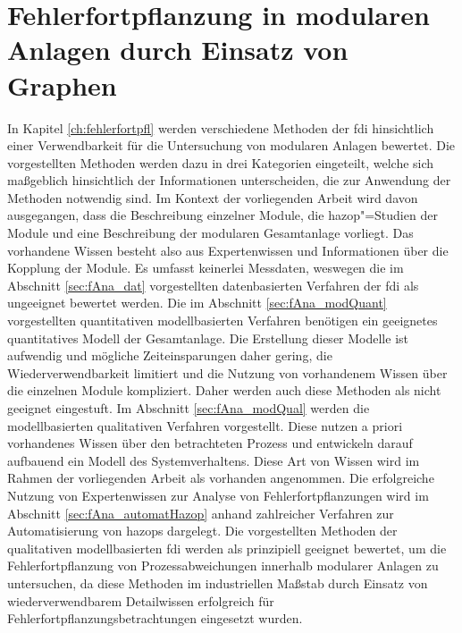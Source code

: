 \chapter{Fehlerfortpflanzung in modularen Anlagen durch Einsatz von Graphen}\label{ch:ffpflMod}
In Kapitel \ref{ch:fehlerfortpfl} werden verschiedene Methoden der \acf{fdi} hinsichtlich einer Verwendbarkeit f\"ur die Untersuchung von modularen Anlagen bewertet. Die vorgestellten Methoden werden dazu in drei Kategorien eingeteilt, welche sich ma\ss{}geblich hinsichtlich der Informationen unterscheiden, die zur Anwendung der Methoden notwendig sind. Im Kontext der vorliegenden Arbeit wird davon ausgegangen, dass die Beschreibung einzelner Module, die \ac{hazop}"=Studien der Module und eine Beschreibung der modularen Gesamtanlage vorliegt. Das vorhandene Wissen besteht also aus Expertenwissen und Informationen \"uber die Kopplung der Module. Es umfasst keinerlei Messdaten, weswegen die im Abschnitt \ref{sec:fAna_dat} vorgestellten datenbasierten Verfahren der \ac{fdi} als ungeeignet bewertet werden. \newline
Die im Abschnitt \ref{sec:fAna_modQuant} vorgestellten quantitativen modellbasierten Verfahren ben\"otigen ein geeignetes quantitatives Modell der Gesamtanlage. Die Erstellung dieser Modelle ist aufwendig und m\"ogliche Zeiteinsparungen daher gering, die Wiederverwendbarkeit limitiert und die Nutzung von vorhandenem Wissen \"uber die einzelnen Module kompliziert. Daher werden auch diese Methoden als nicht geeignet eingestuft. \newline
Im Abschnitt \ref{sec:fAna_modQual} werden die modellbasierten qualitativen Verfahren vorgestellt. Diese nutzen a priori vorhandenes Wissen \"uber den betrachteten Prozess und entwickeln darauf aufbauend ein Modell des Systemverhaltens. Diese Art von Wissen wird im Rahmen der vorliegenden Arbeit als vorhanden angenommen. Die erfolgreiche Nutzung von Expertenwissen zur Analyse von Fehlerfortpflanzungen wird im Abschnitt \ref{sec:fAna_automatHazop} anhand zahlreicher Verfahren zur Automatisierung von \acp{hazop} dargelegt. Die vorgestellten Methoden der qualitativen modellbasierten \ac{fdi} werden als prinzipiell geeignet bewertet, um die Fehlerfortpflanzung von Prozessabweichungen innerhalb modularer Anlagen zu untersuchen, da diese Methoden im industriellen Ma\ss{}stab durch Einsatz von wiederverwendbarem Detailwissen erfolgreich f\"ur Fehlerfortpflanzungsbetrachtungen eingesetzt wurden. \newline
